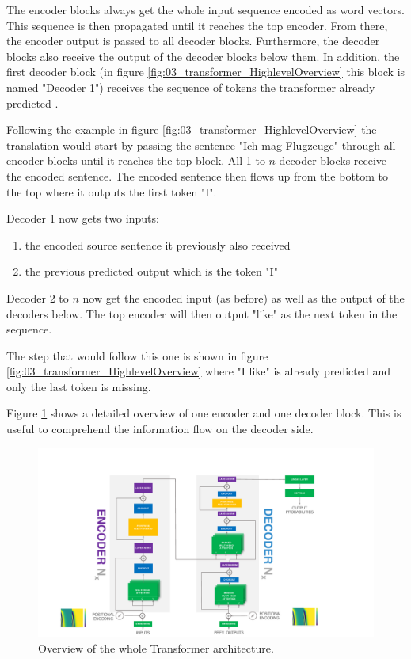 The encoder blocks always get the whole input sequence encoded as word vectors. This sequence is then propagated until it reaches the top encoder. From there, the encoder output is passed to all decoder blocks. Furthermore, the decoder blocks also receive the output of the decoder blocks below them. In addition, the first decoder block {(in figure \ref{fig:03_transformer_HighlevelOverview} this block is named "Decoder 1")} receives the sequence of tokens the transformer already predicted \cite{Vaswani2017d}. 
\medskip

Following the example in figure \ref{fig:03_transformer_HighlevelOverview} the translation would start by passing the sentence "Ich mag Flugzeuge" through all encoder blocks until it reaches the top block. All 1 to $n$ decoder blocks receive the encoded sentence. The encoded sentence then flows up from the bottom to the top where it outputs the first token "I". 

Decoder 1 now gets two inputs: 

\begin{enumerate}
	\item the encoded source sentence it previously also received
	\item the previous predicted output which is the token "I"
\end{enumerate}

Decoder 2 to $n$ now get the encoded input {(as before)} as well as the output of the decoders below. The top encoder will then output "like" as the next token in the sequence. 

The step that would follow this one is shown in figure \ref{fig:03_transformer_HighlevelOverview} where "I like" is already predicted and only the last token is missing.
\bigskip

Figure \ref{fig:03_transformer_overview} shows a detailed overview of one encoder and one decoder block. This is useful to comprehend the information flow on the decoder side.

\begin{figure}[t]
	\centering
	\includegraphics[width=\textwidth]{figures/03_theory/03_transformerArchitectureOverview}
	\caption{Overview of the whole Transformer architecture.}
	\label{fig:03_transformer_overview}
\end{figure}

